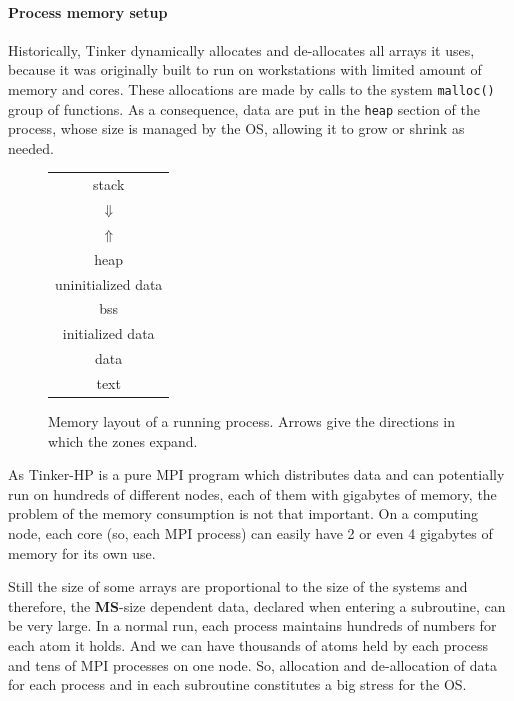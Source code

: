 \documentclass[9pt,comparison]{livecoms}
\newcommand{\lv}{\Large\verb}
\begin{document}
\paragraph{\normalsize Process memory setup}
\hspace{\parindent}Historically, Tinker dynamically allocates and de-allocates all arrays it uses, because it was originally built to run on workstations with limited amount of memory and cores. These allocations are made by calls to the system {\color{codegreen}\lv|malloc()|} group of functions. As a consequence, data are put in the {\color{codepurple}\lv|heap|} section of the process, whose size is managed by the OS, allowing it to grow or shrink as needed.
\begin{figure}[htbp!]
    \centering
    \begin{tabular}{|c|}
         \hline
         {\color{codepurple} stack} \\
         \hdashline
         \color{codepurple}$\Downarrow$ \\
         \color{codepurple}$\Uparrow$\\
         \hdashline
         {\color{codepurple} heap}\\
         \hline
         uninitialized data\\
         {\color{codepurple}bss}\\
         \hline
         initialized data\\
         {\color{codepurple} data}\\
         \hline
         {\color{codepurple} text}\\
         \hline
    \end{tabular}
    \caption{Memory layout of a running process. Arrows give the directions in which the zones expand.}
\label{fig:Program_layout}
\end{figure}

As Tinker-HP is a pure MPI program which distributes data and can potentially run on hundreds of different nodes, each of them with gigabytes of memory, the problem of the memory consumption is not that important. On a computing node, each core (so, each MPI process) can easily have 2 or even 4 gigabytes of memory for its own use. 

Still the size of some arrays are proportional to the size of the systems and therefore, the \textbf{MS}-size dependent data, declared when entering a subroutine, can be very large. In a normal run, each process maintains hundreds of numbers for each atom it holds. And we can have thousands of atoms held by each process and tens of MPI processes on one node. So, allocation and de-allocation of data for each process and in each subroutine constitutes a big stress for the OS. 
\end{document}

